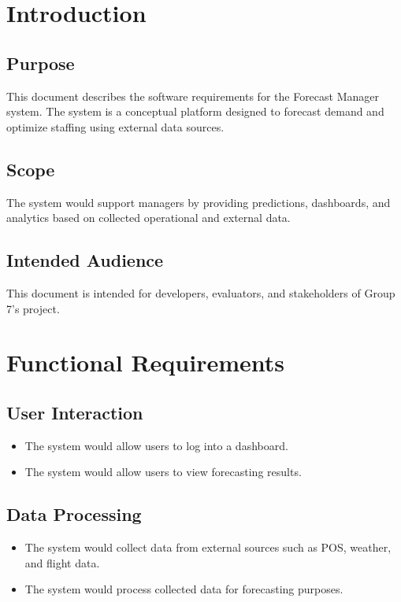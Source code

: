 \documentclass[12pt]{report}
\begin{document}
\section{Introduction}

\subsection{Purpose}
This document describes the software requirements for the Forecast Manager system. The system is a conceptual platform designed to forecast demand and optimize staffing using external data sources.

\subsection{Scope}
The system would support managers by providing predictions, dashboards, and analytics based on collected operational and external data.

\subsection{Intended Audience}
This document is intended for developers, evaluators, and stakeholders of Group 7’s project.


\section{Functional Requirements}

\subsection{User Interaction}
\begin{itemize}
    \item The system would allow users to log into a dashboard.
    \item The system would allow users to view forecasting results.
\end{itemize}

\subsection{Data Processing}
\begin{itemize}
    \item  The system would collect data from external sources such as POS, weather, and flight data.
    \item  The system would process collected data for forecasting purposes.
\end{itemize}
\end{document}

